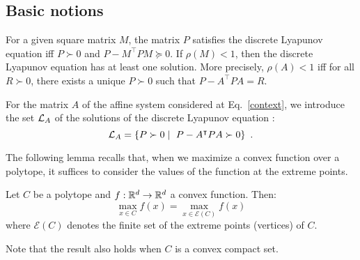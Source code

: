 \documentclass[10pt]{llncs}
\begin{document}
\subsection{Basic notions}

For a given square matrix $M$, the matrix $P$ satisfies the discrete Lyapunov equation iff $P\succ 0$ and $P-M^\intercal P M\succeq 0$. If $\rho(M)<1$, then the discrete Lyapunov equation has at least one solution. More precisely, $\rho(A)<1$ iff for all $R\succ 0$, there exists a unique $P\succ 0$ such that $P-A^\intercal P A=R$. 

For the matrix $A$ of the affine system considered at Eq.~\eqref{context}, we introduce the set $\mathcal{L}_{A}$ of the  solutions  of the discrete Lyapunov equation :
\[
\mathcal{L}_{A}=\{P\succ 0 \mid\ P-A^\intercal P A\succ 0\}\enspace .
\]


The following lemma recalls that, when we maximize a convex function over a polytope, it suffices to consider the values of the function at the extreme points. 
\begin{lemma}
\label{lemma2}
Let $C$ be a polytope and $f:\mathbb R^d\to\mathbb R^d$ a convex function. Then:
\[
\max_{x\in C} f(x)=\max_{x\in \mathcal{E}(C)} f(x)
\]
where $\mathcal{E}(C)$ denotes the finite set of the extreme points (vertices) of $C$.
\end{lemma}
Note that the result also holds when $C$ is a convex compact set.  
\end{document}
